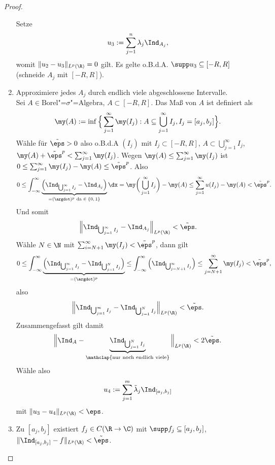 \begin{st}
\begin{proof}
\begin{enumerate}[1)]
				Setze
				\[
					u_3 := \sum_{j=1}^n \lambda_j \Ind_{A_j},
				\]
				womit $\|u_2 - u_3\|_{L^p(\R)} = 0$ gilt.
				Es gelte o.B.d.A. $\supp u_3 \subset [-R,R]$ (schneide $A_j$ mit $[-R,R]$).
			\item
				Approximiere jedes $A_j$ durch endlich viele abgeschlossene Intervalle. \\
				Sei $A \in \text{Borel"=$\sigma$"=Algebra}$, $A \subset [-R,R]$.
				Das Maß von $A$ ist definiert als
				\[
					\my(A) := \inf \Big\{ \sum_{j=1}^\infty \my(I_j) : A \subset \bigcup_{j=1}^\infty I_j, I_j = [a_j, b_j] \Big\}.
				\]
				Wähle für $\tilde \eps > 0$ also o.B.d.A $(I_j)$ mit $I_j \subset [-R,R]$, $A \subset \bigcup_{j=1}^\infty I_j$, $\my(A) + \tilde \eps^p < \sum_{j=1}^\infty \my(I_j)$.
				Wegen $\my(A) \le \sum_{j=1}^\infty \my(I_j)$ ist $0 \le \sum_{j=1}^\infty \my(I_j) - \my(A) \le \tilde \eps^p$.
				Also
				\begin{align*}
					0
					\le \int_{-\infty}^\infty \underbrace{\Big(\Ind_{\bigcup_{j=1}^\infty I_j} - \Ind_{A_j}\Big)}_{=(\argdot)^p \text{ da $\in \{0,1\}$}} \dx
					= \my\bigg(\bigcup_{j=1}^\infty I_j \bigg) - \my(A)
					\le \sum_{j=1}^\infty u(I_j) - \my(A)
					< \tilde \eps^p.
				\end{align*}
				Und somit
				\[
					\Big\|\Ind_{\bigcup_{j=1}^\infty I_j} - \Ind_{A_j}\Big\|_{L^p(\R)} < \tilde \eps.
				\]
				Wähle $N \in \N$ mit $\sum_{i=N+1}^\infty \my(I_j) < \tilde \eps^p$, dann gilt
				\begin{align*}
					0
					\le \int_{-\infty}^\infty \underbrace{\Big(\Ind_{\bigcup_{j=1}^\infty I_j} - \Ind_{\bigcup_{j=1}^N I_j}\Big)}_{=(\argdot)^p}
					\le \int_{-\infty}^\infty \Big(\Ind_{\bigcup_{j=N+1}^\infty I_j}\Big)
					\le \sum_{j=N+1}^\infty \my(I_j)
					< \tilde \eps^p,
				\end{align*}
				also
				\[
					\Big\| \Ind_{\bigcup_{j=1}^\infty I_j} - \Ind_{\bigcup_{j=1}^N I_j} \Big\|_{L^p(\R)} < \tilde \eps.
				\]
				Zusammengefasst gilt damit
				\[
					\Big\| \Ind_A - \underbrace{\Ind_{\bigcup_{j=1}^N I_j}}_{\mathclap{\text{nur noch endlich viele}}} \Big\|_{L^p(\R)} < 2 \tilde \eps.
				\]
				Wähle also
				\[
					u_4 := \sum_{j=1}^m  \tilde \lambda_j \Ind_{[a_j,b_j]}
				\]
				mit $\|u_3 - u_4\|_{L^p(\R)} < \eps$.
			\item
				Zu $[a_j,b_j]$ existiert $f_j \in C(\R \to \C)$ mit $\supp f_j \subset [a_j, b_j]$, $\|\Ind_{[a_j,b_j]} - f\|_{L^p(\R)} < \tilde \eps$.


\end{enumerate}
\end{proof}
\end{st}
